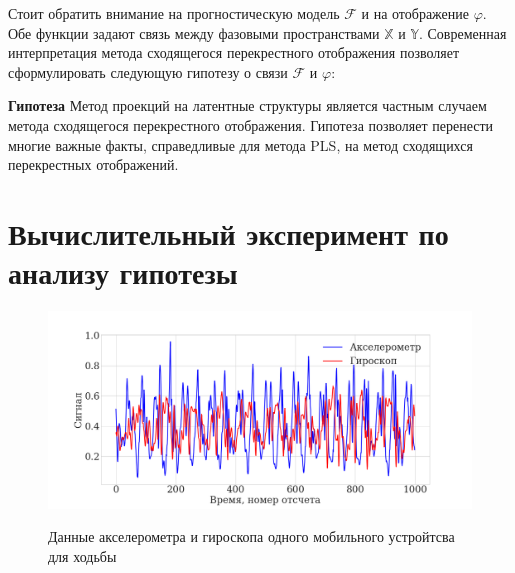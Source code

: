 \documentclass[12pt]{extarticle}
\begin{document}
Стоит обратить внимание на прогностическую модель $\mathcal{F}$ и на отображение $\varphi$. Обе функции задают связь между фазовыми пространствами $\mathbb{X}$ и $\mathbb{Y}$. Современная интерпретация метода сходящегося перекрестного отображения позволяет сформулировать следующую гипотезу о связи $\mathcal{F}$ и $\varphi$:

\textbf{Гипотеза}
Метод проекций на латентные структуры является частным случаем метода сходящегося перекрестного отображения.
\newpage
Гипотеза позволяет перенести многие важные факты, справедливые для метода PLS, на метод сходящихся перекрестных отображений.

\section{Вычислительный эксперимент по анализу гипотезы}


\begin{figure}[h!]
\centering
{\includegraphics[width=1.1\textwidth]{./images/acc+gyr_new-2.png}}
\caption{Данные акселерометра и гироскопа одного мобильного устройтсва для ходьбы}
\label{fg:signal}
\end{figure}
\end{document}
